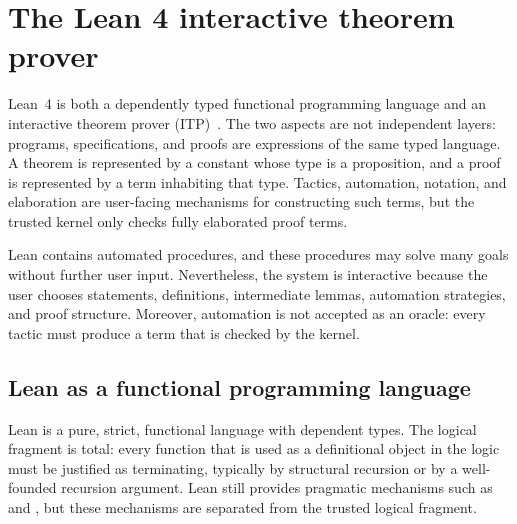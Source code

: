 \providecommand{\Lean}{Lean~4}
\providecommand{\Prop}{\ensuremath{\mathsf{Prop}}}
\providecommand{\Sort}{\ensuremath{\mathsf{Sort}}}
\providecommand{\Type}{\ensuremath{\mathsf{Type}}}
\providecommand{\defeq}{\mathrel{:=}}
\providecommand{\judges}{\mathrel{\vdash}}

\ifdefined\leandefinition\else
\newenvironment{leandefinition}[1]{%
\par\medskip\noindent\textbf{Definition (#1).}\ }{\par\medskip}
\fi
\ifdefined\leanremark\else
\newenvironment{leanremark}[1]{%
\par\medskip\noindent\textbf{Remark (#1).}\ }{\par\medskip}
\fi

\section{The Lean 4 interactive theorem prover}
\label{sec:lean}

\Lean{} is both a dependently typed functional programming language and an
interactive theorem prover (ITP)~\cite{deMouraUllrich2021Lean4,LeanReferenceManual}.  The two aspects are not independent layers:
programs, specifications, and proofs are expressions of the same typed language.
A theorem is represented by a constant whose type is a proposition, and a proof
is represented by a term inhabiting that type.  Tactics, automation, notation,
and elaboration are user-facing mechanisms for constructing such terms, but the
trusted kernel only checks fully elaborated proof terms.

Lean contains automated procedures, and these procedures may solve many goals without further user input.
Nevertheless, the system is interactive because the user chooses statements, definitions, intermediate lemmas, automation strategies, and proof
structure.
Moreover, automation is not accepted as an oracle: every tactic must produce a term that is checked by the kernel.

\subsection{Lean as a functional programming language}
\label{subsec:lean-programming}

Lean is a pure, strict, functional language with dependent types.
The logical fragment is total: every function that is used as a definitional object in the logic must be justified as terminating, typically by structural recursion or by a well-founded recursion argument.
Lean still provides pragmatic mechanisms such as  and , but these mechanisms are separated from the trusted logical fragment.

